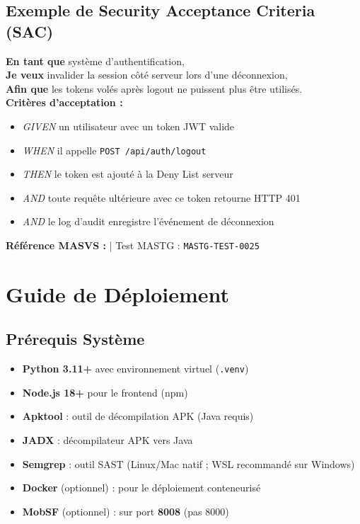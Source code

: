 \documentclass[12pt,a4paper,french]{article}
\begin{document}
\subsection{Exemple de Security Acceptance Criteria (SAC)}

\begin{tcolorbox}[mavsbox, title={User Story Jira — US-SEC-05 : Invalidation de session}]
\textbf{En tant que} système d'authentification,\\
\textbf{Je veux} invalider la session côté serveur lors d'une déconnexion,\\
\textbf{Afin que} les tokens volés après logout ne puissent plus être utilisés.\\[6pt]
\textbf{Critères d'acceptation :}
\begin{itemize}
  \item \textit{GIVEN} un utilisateur avec un token JWT valide
  \item \textit{WHEN} il appelle \texttt{POST /api/auth/logout}
  \item \textit{THEN} le token est ajouté à la Deny List serveur
  \item \textit{AND} toute requête ultérieure avec ce token retourne HTTP 401
  \item \textit{AND} le log d'audit enregistre l'événement de déconnexion
\end{itemize}
\textbf{Référence MASVS :}  | Test MASTG : \texttt{MASTG-TEST-0025}
\end{tcolorbox}

\section{Guide de Déploiement}

\subsection{Prérequis Système}

\begin{tcolorbox}[warnbox, title={Outils Externes Requis}]
\begin{itemize}[itemsep=2pt]
  \item \textbf{Python 3.11+} avec environnement virtuel (\texttt{.venv})
  \item \textbf{Node.js 18+} pour le frontend (npm)
  \item \textbf{Apktool} : outil de décompilation APK (Java requis)
  \item \textbf{JADX} : décompilateur APK vers Java
  \item \textbf{Semgrep} : outil SAST (Linux/Mac natif ; WSL recommandé sur Windows)
  \item \textbf{Docker} (optionnel) : pour le déploiement conteneurisé
  \item \textbf{MobSF} (optionnel) : sur port \textbf{8008} (pas 8000)
\end{itemize}
\end{tcolorbox}
\end{document}
